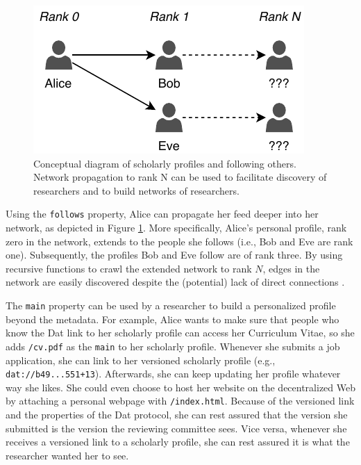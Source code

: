 \documentclass[publications,article,submit,moreauthors,pdftex,10pt,a4paper]{Definitions/mdpi}
\begin{document}
\begin{figure}

{\centering \includegraphics[width=1\linewidth]{fig3} 

}

\caption{Conceptual diagram of scholarly profiles and following others. Network propagation to rank N can be used to facilitate discovery of researchers and to build networks of researchers.}\label{fig:datcom-fig3}
\end{figure}

Using the \texttt{follows} property, Alice can propagate her feed deeper
into her network, as depicted in Figure \ref{fig:datcom-fig3}. More
specifically, Alice's personal profile, rank zero in the network, extends
to the people she follows (i.e., Bob and Eve are rank one).
Subsequently, the profiles Bob and Eve follow are of rank three. By
using recursive functions to crawl the extended network to rank \(N\),
edges in the network are easily discovered despite the (potential) lack
of direct connections \citep{doi:10.2307/2786545}.

The \texttt{main} property can be used by a researcher to build a
personalized profile beyond the metadata. For example, Alice wants to
make sure that people who know the Dat link to her scholarly profile can
access her Curriculum Vitae, so she adds \texttt{/cv.pdf} as the
\texttt{main} to her scholarly profile. Whenever she submits a job
application, she can link to her versioned scholarly profile (e.g.,
\texttt{dat://b49...551+13}). Afterwards, she can keep updating her
profile whatever way she likes. She could even choose to host her
website on the decentralized Web by attaching a personal webpage with
\texttt{/index.html}. Because of the versioned link and the properties
of the Dat protocol, she can rest assured that the version she submitted
is the version the reviewing committee sees. Vice versa, whenever she
receives a versioned link to a scholarly profile, she can rest assured
it is what the researcher wanted her to see.
\end{document}
